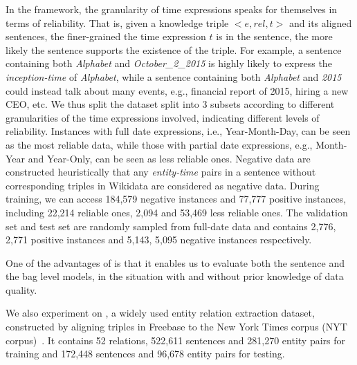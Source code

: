 In the \DS framework, the granularity of time expressions speaks for themselves in
terms of reliability. That is, given a knowledge triple $<$$e,rel,t$$>$ and its
aligned sentences,  the  finer-grained the time expression $t$ is in the sentence,
the more likely the sentence  supports the existence of the triple.
For example, a sentence containing both \emph{Alphabet} and \emph{October\_2\_2015} is highly likely to express the \emph{inception-time} of \emph{Alphabet}, while a sentence containing both \emph{Alphabet} and \emph{2015} could instead talk  about many events, e.g.,  financial report of 2015, hiring a new CEO, etc.
We thus split the dataset split into
3 subsets according to different granularities of the time expressions involved, indicating different levels of reliability. 
Instances with full date expressions, i.e., Year-Month-Day, can be seen as the most reliable data, while those with
partial date expressions, e.g., Month-Year and Year-Only, can be seen as less
reliable ones.  Negative data are constructed  heuristically that any
\emph{entity-time} pairs in a sentence without corresponding triples in Wikidata are considered as negative data. 
During training, we can access  184,579 negative
instances and  77,777 positive instances, including 22,214 reliable
ones, 2,094 and 53,469 less reliable ones. The validation set and test set are randomly sampled from full-date data and contains
2,776, 2,771 positive instances and 5,143, 5,095 negative instances respectively. 


One of the advantages of \TimeRE is that it enables us to evaluate both the sentence and the bag level models, in the situation with and without prior knowledge of data quality.

We also experiment on \EntityRE, a widely used entity
relation extraction dataset, constructed by aligning triples
in Freebase to the New York Times corpus (NYT
corpus)~\cite{riedel2010modeling}. It contains 52 relations, 522,611 sentences and 281,270
entity pairs for training and  172,448 sentences and 96,678 entity pairs for
testing.  


